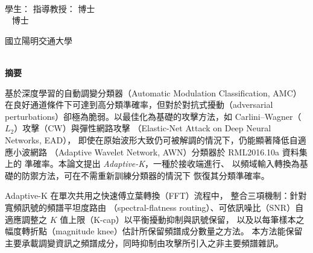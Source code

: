 \begin{center}
    \large
    \begin{singlespace}    
        \textbf{\chineseTitle{}} \\[0.5cm]
    \end{singlespace}

    \begin{singlespace}    
    學生：\studentCnName  \hspace{2.5cm}  指導教授：\advisorCnName \hspace{0.1cm} 博士 \\

    \ifdefined\advisorCnNameB %
        \hspace{9.6cm}  \advisorCnNameB ~ 博士 \\
    \fi
    \end{singlespace}

    \vspace{0.5cm}

    \begin{singlespace}
        國立陽明交通大學\\
        \NameofDepartmentInstituteCN\\[0.2cm]
    \end{singlespace}

    \textbf{摘\hspace{1cm}要} \\[0.5cm]

\end{center}

\normalsize 

基於深度學習的自動調變分類器（Automatic Modulation Classification, AMC）
在良好通道條件下可達到高分類準確率，但對於對抗式擾動（adversarial
perturbations）卻極為脆弱。以最佳化為基礎的攻擊方法，如
Carlini--Wagner（$L_2$）攻擊（CW）與彈性網路攻擊
（Elastic-Net Attack on Deep Neural Networks, EAD），
即使在原始波形大致仍可被解調的情況下，仍能顯著降低自適應小波網路
（Adaptive Wavelet Network, AWN）分類器於 RML2016.10a 資料集上的
準確率。本論文提出 \emph{Adaptive-K}，一種於接收端進行、
以頻域輸入轉換為基礎的防禦方法，可在不需重新訓練分類器的情況下
恢復其分類準確率。

Adaptive-K 在單次共用之快速傅立葉轉換（FFT）流程中，
整合三項機制：針對寬頻訊號的頻譜平坦度路由
（spectral-flatness routing）、可依訊噪比（SNR）自適應調整之
$K$ 值上限（K-cap）以平衡擾動抑制與訊號保留，
以及以每筆樣本之幅度轉折點（magnitude knee）估計所保留頻譜成分數量之方法。
本方法能保留主要承載調變資訊之頻譜成分，同時抑制由攻擊所引入之非主要頻譜雜訊。


